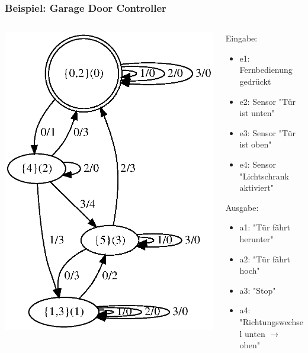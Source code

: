     
    \begin{frame}
    \frametitle{Beispiel: Garage Door Controller}
    \begin{columns}[T] %
    \begin{column}{.55\textwidth}
    
    \includegraphics[width=\textwidth]{images/gdc_min}
    \end{column}%
    \hfill%
    \begin{column}{.55\textwidth}
    Eingabe:
    \begin{itemize}
      \item e1: Fernbedienung gedrückt
      \item e2: Sensor "Tür ist unten"
      \item e3: Sensor "Tür ist oben"
      \item e4: Sensor "Lichtschrank aktiviert"
    \end{itemize}
    Ausgabe:
    \begin{itemize}
      \item a1: "Tür fährt herunter"
      \item a2: "Tür fährt hoch"
      \item a3: "Stop"
      \item a4: "Richtungswechsel unten $\rightarrow$ oben"
    \end{itemize}
    \end{column}%
    \end{columns}
    \end{frame}
    
